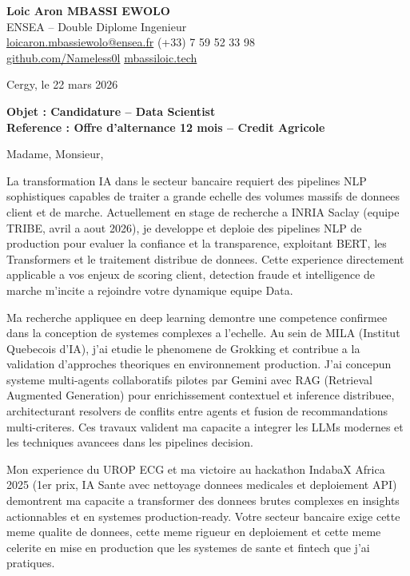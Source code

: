 \documentclass[a4paper,11pt]{article}
\begin{document}
\noindent
\textbf{Loic Aron MBASSI EWOLO} \\
ENSEA -- Double Diplome Ingenieur \\
\href{mailto:loicaron.mbassiewolo@ensea.fr}{loicaron.mbassiewolo@ensea.fr} \quad (+33) 7 59 52 33 98 \\
\href{https://github.com/Nameless0l}{github.com/Nameless0l} \quad \href{https://mbassiloic.tech}{mbassiloic.tech}

\vspace{1em}
\noindent
Cergy, le 22 mars 2026

\vspace{1em}
\noindent
\textbf{Objet : Candidature -- Data Scientist} \\
\textbf{Reference : Offre d'alternance 12 mois -- Credit Agricole}

\vspace{1.5em}
\noindent Madame, Monsieur,

La transformation IA dans le secteur bancaire requiert des pipelines NLP sophistiques capables de traiter a grande echelle des volumes massifs de donnees client et de marche. Actuellement en stage de recherche a INRIA Saclay (equipe TRIBE, avril a aout 2026), je developpe et deploie des pipelines NLP de production pour evaluer la confiance et la transparence, exploitant BERT, les Transformers et le traitement distribue de donnees. Cette experience directement applicable a vos enjeux de scoring client, detection fraude et intelligence de marche m'incite a rejoindre votre dynamique equipe Data.

Ma recherche appliquee en deep learning demontre une competence confirmee dans la conception de systemes complexes a l'echelle. Au sein de MILA (Institut Quebecois d'IA), j'ai etudie le phenomene de Grokking et contribue a la validation d'approches theoriques en environnement production. J'ai concepun systeme multi-agents collaboratifs pilotes par Gemini avec RAG (Retrieval Augmented Generation) pour enrichissement contextuel et inference distribuee, architecturant resolvers de conflits entre agents et fusion de recommandations multi-criteres. Ces travaux valident ma capacite a integrer les LLMs modernes et les techniques avancees dans les pipelines decision.

Mon experience du UROP ECG et ma victoire au hackathon IndabaX Africa 2025 (1er prix, IA Sante avec nettoyage donnees medicales et deploiement API) demontrent ma capacite a transformer des donnees brutes complexes en insights actionnables et en systemes production-ready. Votre secteur bancaire exige cette meme qualite de donnees, cette meme rigueur en deploiement et cette meme celerite en mise en production que les systemes de sante et fintech que j'ai pratiques.
\end{document}

